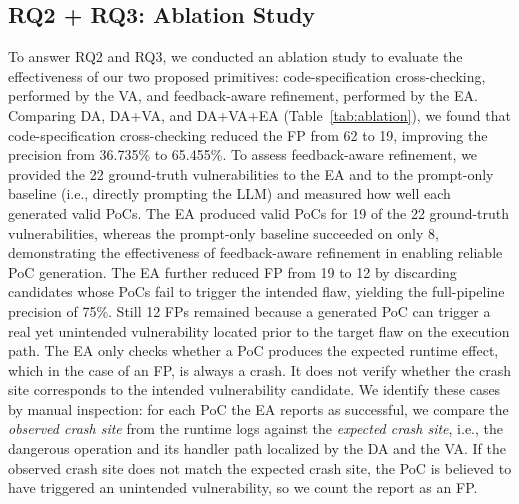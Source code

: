 \subsection{RQ2 + RQ3: Ablation Study}
\label{sec:ablation}

To answer RQ2 and RQ3, we conducted an ablation study to evaluate the effectiveness of our two proposed primitives: code-specification cross-checking, performed by the VA, and feedback-aware refinement, performed by the EA. 
Comparing DA, DA+VA, and DA+VA+EA (Table~\ref{tab:ablation}), we found that code-specification cross-checking reduced the FP from 62 to 19, improving the precision from 36.735\% to 65.455\%.
To assess feedback-aware refinement, we provided the 22 ground-truth vulnerabilities to the EA and to the prompt-only baseline (i.e., directly prompting the LLM) and measured how well each generated valid PoCs.
The EA produced valid PoCs for 19 of the 22 ground-truth vulnerabilities, whereas the prompt-only baseline succeeded on only 8, demonstrating the effectiveness of feedback-aware refinement in enabling reliable PoC generation.
The EA further reduced FP from 19 to 12 by discarding candidates whose PoCs fail to trigger the intended flaw, yielding the full-pipeline precision of 75\%.
Still 12 FPs remained because a generated PoC can trigger a real yet unintended vulnerability located prior to the target flaw on the execution path. 
The EA only checks whether a PoC produces the expected runtime effect, which in the case of an FP, is always a crash. 
It does not verify whether the crash site corresponds to the intended vulnerability candidate.
We identify these cases by manual inspection: for each PoC the EA reports as successful, we compare the \textit{observed crash site} from the runtime logs against the \textit{expected crash site}, i.e., the dangerous operation and its handler path localized by the DA and the VA. 
If the observed crash site does not match the expected crash site, the PoC is believed to have triggered an unintended vulnerability, so we count the report as an FP. 



\begin{table}[!t]
  \centering
  \caption{Ablation study.}
  \label{tab:ablation}
\end{table}












